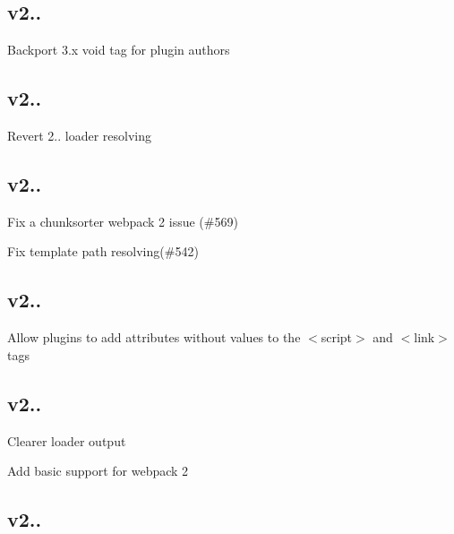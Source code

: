 \subsection*{v2.. }


\begin{DoxyItemize}
\item Backport 3.\+x void tag for plugin authors
\end{DoxyItemize}

\subsection*{v2.. }


\begin{DoxyItemize}
\item Revert 2.. loader resolving
\end{DoxyItemize}

\subsection*{v2.. }


\begin{DoxyItemize}
\item Fix a chunksorter webpack 2 issue (\#569)
\item Fix template path resolving(\#542)
\end{DoxyItemize}

\subsection*{v2.. }


\begin{DoxyItemize}
\item Allow plugins to add attributes without values to the {\ttfamily $<$script$>$} and {\ttfamily $<$link$>$} tags
\end{DoxyItemize}

\subsection*{v2.. }


\begin{DoxyItemize}
\item Clearer loader output
\item Add basic support for webpack 2
\end{DoxyItemize}

\subsection*{v2.. }


